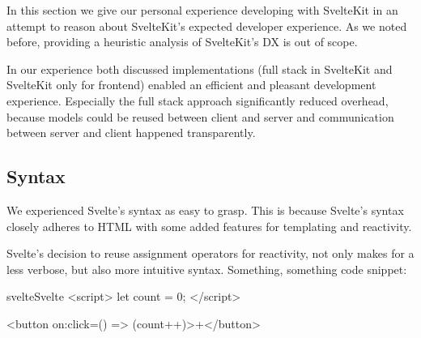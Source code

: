
In this section we give our personal experience developing with SvelteKit in an attempt to reason about SvelteKit's expected developer experience. As we noted before, providing a heuristic analysis of SvelteKit's DX is out of scope. 

In our experience both discussed implementations (full stack in SvelteKit and SvelteKit only for frontend) enabled an efficient and pleasant development experience. Especially the full stack approach significantly reduced overhead, because models could be reused between client and server and communication between server and client happened transparently.



\subsection{Syntax}

We experienced Svelte's syntax as easy to grasp. This is because Svelte's syntax closely adheres to HTML with some added features for templating and reactivity. 

Svelte's decision to reuse assignment operators for reactivity, not only makes for a less verbose, but also more intuitive syntax. Something, something code snippet:

\begin{myminted}{svelte}{Svelte}
<script>
    let count = 0;
</script>

<button on:click={() => (count++)}>+</button>
\end{myminted}
 
